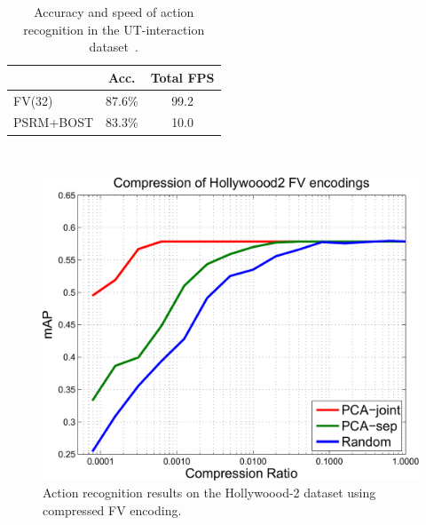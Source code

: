 \documentclass[10pt,twocolumn,letterpaper]{article}
\begin{document}
\begin{table}
\begin{center}
\begin{tabular}{|l|c|c|}
\hline
								& Acc.		& Total FPS	\\\hline
FV(32)						& 87.6\%		& 99.2		\\\hline
PSRM+BOST\cite{Yu10}	& 83.3\%		& 10.0 		\\\hline

\end{tabular}
\mbox{}\vspace{.2cm}\\
\caption{Accuracy and speed of action recognition in the UT-interaction dataset~\cite{Ryoo10}.\vspace{-.6cm}}
\label{tab:uti_comparison}
\end{center}
\end{table}

\begin{figure}
\begin{center}
\includegraphics[width=.8\linewidth]{figures/compression/compression-hwd2-FV-sum96-all-cropped.pdf}
\caption{Action recognition results on the Hollywoood-2 dataset using compressed FV encoding.\vspace{-.5cm}}
\label{fig:dimred}
\end{center}
\end{figure}
\end{document}

